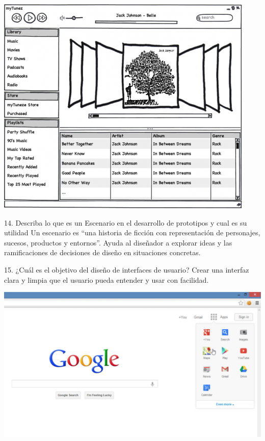 \documentclass{beamer}
\begin{document}
\begin{frame}
\begin{center}
\includegraphics[scale = 0.4]{8.png}
\end{center}
\end{frame}

\begin{frame}
\begin{block}{14. Describa lo que es un Escenario en el desarrollo de prototipos y cual es su utilidad}
Un escenario es “una historia de ficción con representación de personajes, sucesos, productos y entornos”. Ayuda al diseñador a explorar ideas y las ramificaciones de decisiones de diseño en situaciones concretas.
\end{block}
\begin{block}{15. ¿Cuál es el objetivo del diseño de interfaces de usuario?}
Crear una interfaz clara y limpia que el usuario pueda entender y usar con facilidad.
\end{block}
\end{frame}

\begin{frame}
\begin{center}
\includegraphics[scale = 0.2]{9.png}
\end{center}
\end{frame}
\end{document}
